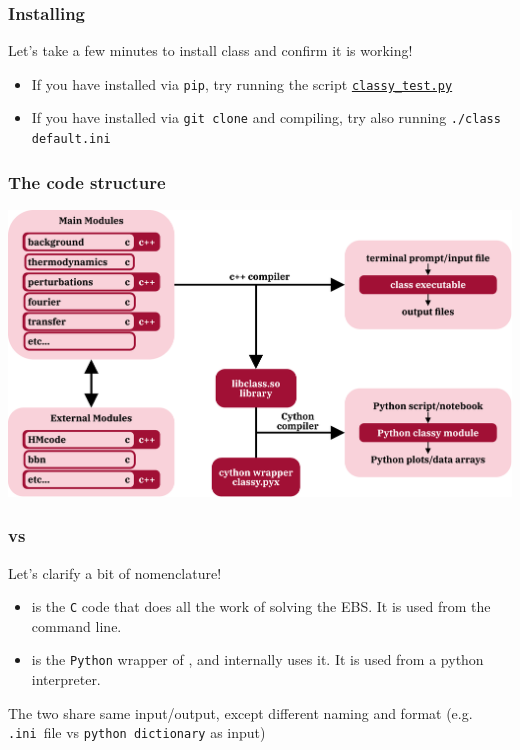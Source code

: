\begin{frame}[fragile]
	\frametitle{Installing \CLASS{}}
Let's take a few minutes to install class and confirm it is working!

\begin{itemize}
	\item If you have installed \classy{} via \texttt{pip}, try running the script \texttt{\href{https://github.com/MarkMos/class_lecture/blob/main/notebooks/classy_test.py}{classy\_test.py}}\\
	\item If you have installed \CLASS{} via \texttt{git clone} and compiling, try also running \texttt{./class default.ini}
\end{itemize}

\end{frame}


\begin{frame}[fragile]
	\frametitle{The code structure}
\includegraphics[width=\textwidth]{Figures/class_structure.pdf}

\end{frame}

\begin{frame}[fragile]
	\frametitle{\CLASS{} vs \classy{}}
	Let's clarify a bit of nomenclature!
	\begin{itemize}
		\item {\Red \CLASS{}} is the \texttt{C} code that does all the work of solving the EBS. It is used from the command line.
		\item {\Purple \classy{}} is the \texttt{Python} wrapper of {\Red \CLASS{}}, and internally uses it. It is used from a python interpreter.
	\end{itemize}
	The two share same input/output, except different naming and format
	(e.g. \mbox{\Red\texttt{.ini} file}  vs \texttt{\Purple python dictionary} as input)
\end{frame}

